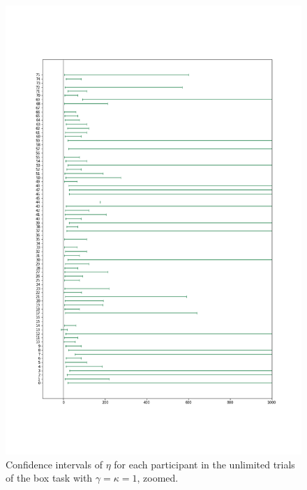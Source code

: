 \begin{figure}
    \centering
    \includegraphics[scale=0.38]{pictures/all_cis_unlim_eta_zoomed.png}
    \caption[CIs for $\eta$ zoomed, unlimited. $\gamma=\kappa=1$]{Confidence intervals of $\eta$ for each participant in the unlimited trials of the box task with $\gamma=\kappa=1$, zoomed.}
    \label{fig:all_cis_eta_unlim_zoomed}
\end{figure}


